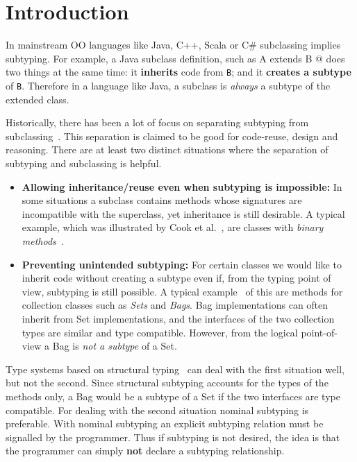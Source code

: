 \saveSpace
\section{Introduction}\label{sec:intro}
\saveSpace
In mainstream OO languages like Java, C++, Scala or C\# subclassing 
implies subtyping. For example, a Java subclass definition, such as 
\Q@class A extends B {}@
\noindent does two things at the same time:
it {\bf inherits} code from \lstinline{B}; and it {\bf creates
a subtype} of \lstinline{B}. Therefore in a language like Java, 
a subclass is \emph{always} a subtype of the extended class.

Historically, there has been a lot of focus on
separating subtyping from subclassing~\cite{cook}.  This separation is claimed to be
good for code-reuse, design and reasoning. There are at
least two distinct situations where the separation of subtyping and 
subclassing is helpful.

\begin{itemize}

\item {\bf Allowing inheritance/reuse even when subtyping is impossible:} 
In some situations a subclass contains methods whose signatures 
are incompatible with the superclass, yet inheritance is still
desirable. A typical example, which was illustrated by Cook et al.~\cite{cook}, are 
classes with \emph{binary methods}~\cite{bruce96binary}.

\item {\bf Preventing unintended subtyping:} For certain classes we
  would like to inherit code without creating a subtype even if, from
  the typing point of view, subtyping is still possible. A typical
  example~\cite{LaLonde:1991:SSS:110673.110679} of this are methods for collection classes such as \emph{Sets} and
  \emph{Bags}. Bag implementations can often inherit 
  from Set implementations, and the interfaces of the two collection types are
  similar and type compatible. 
  However, from the logical point-of-view a Bag is \emph{not a
    subtype} of a Set. 

\end{itemize}

Type systems based on structural typing~\cite{cook} can deal with the first
situation well, but not the second. Since structural subtyping
accounts for the types of the methods only, a Bag would be a subtype
of a Set if the two interfaces are type compatible. For dealing with
the second situation nominal subtyping is preferable. With nominal
subtyping an explicit subtyping relation must be signalled by the
programmer. Thus if subtyping is not desired, the idea is that the
programmer can simply {\bf not} declare a subtyping relationship.

